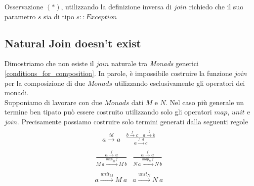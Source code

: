 Osservazione $(*)$, utilizzando la definizione inversa di $join$ richiedo che il suo
parametro $s$ sia di tipo $s::Exception$


\pagebreak
\subsection{Natural Join doesn't exist}
\label{natural_join_doesn_t_exist}
Dimostriamo che non esiste il $join$ naturale tra \textit{Monads} generici
\ref{conditions_for_composition}.
In parole, è impossibile costruire la funzione $join$ per la composizione di due
$Monads$ utilizzando esclusivamente gli operatori dei monadi.\\
Supponiamo di lavorare con due $Monads$ dati $M$ e $N$.
Nel caso più generale un termine ben tipato può essere costruito utilizzando
solo gli operatori $map$, $unit$ e $join$.
Precisamente possiamo costruire solo termini generati dalla seguenti regole
\begin{align*}
  \begin{split}
    a \overset{id}{\longrightarrow} a
  \end{split}
    \begin{split}
      \frac
        {b \overset{f}{\longrightarrow} c\quad a \overset{g}{\longrightarrow} b}
        {a \overset{f\ .\ g}{\longrightarrow} c}
    \end{split}
\end{align*}
\begin{align*}
  \begin{split}
    \frac
      {a \overset{f}{\longrightarrow} a}
      {M\ a \overset{map_M\ f}{\longrightarrow} M\ b}
  \end{split}
  \begin{split}
    \frac
      {a \overset{f}{\longrightarrow} a}
      {N\ a \overset{map_N\ f}{\longrightarrow} N\ b}
  \end{split}
\end{align*}
\begin{align*}
  \begin{split}
    a \overset{unit_M}{\longrightarrow} M\ a
  \end{split}
  \begin{split}
    a \overset{unit_N}{\longrightarrow} N\ a
  \end{split}
\end{align*}
